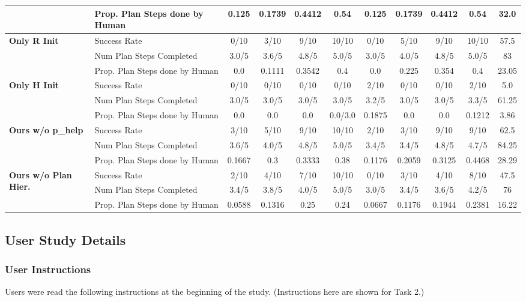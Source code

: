 \begin{table}[h]
{\begin{tabular}{|l|l|c|c|c|c|c|c|c|c|c|}
& Prop. Plan Steps done by Human & 0.125 & 0.1739 & 0.4412 & 0.54 & 0.125 & 0.1739 & 0.4412 & 0.54 & 32.0 \\
\hline
\multirow{3}{*}{\textbf{Only R Init}} 
& Success Rate & 0/10 & 3/10 & 9/10 & 10/10 & 0/10 & 5/10 & 9/10 & 10/10 & 57.5 \\
& Num Plan Steps Completed & 3.0/5 & 3.6/5 & 4.8/5 & 5.0/5 & 3.0/5 & 4.0/5 & 4.8/5 & 5.0/5 & 83 \\
& Prop. Plan Steps done by Human & 0.0 & 0.1111 & 0.3542 & 0.4 & 0.0 & 0.225 & 0.354 & 0.4 & 23.05 \\
\hline
\multirow{3}{*}{\textbf{Only H Init}} 
& Success Rate & 0/10 & 0/10 & 0/10 & 0/10 & 2/10 & 0/10 & 0/10 & 2/10 & 5.0 \\
& Num Plan Steps Completed & 3.0/5 & 3.0/5 & 3.0/5 & 3.0/5 & 3.2/5 & 3.0/5 & 3.0/5 & 3.3/5 & 61.25 \\
& Prop. Plan Steps done by Human & 0.0 & 0.0 & 0.0 & 0.0/3.0 & 0.1875 & 0.0 & 0.0 & 0.1212 & 3.86 \\
\hline
\multirow{3}{*}{\textbf{Ours w/o p\_help}} 
& Success Rate & 3/10 & 5/10 & 9/10 & 10/10 & 2/10 & 3/10 & 9/10 & 9/10 & 62.5 \\
& Num Plan Steps Completed & 3.6/5 & 4.0/5 & 4.8/5 & 5.0/5 & 3.4/5 & 3.4/5 & 4.8/5 & 4.7/5 & 84.25 \\
& Prop. Plan Steps done by Human & 0.1667 & 0.3 & 0.3333 & 0.38 & 0.1176 & 0.2059 & 0.3125 & 0.4468 & 28.29 \\
\hline
\multirow{3}{*}{\textbf{Ours w/o Plan Hier.}} 
& Success Rate & 2/10 & 4/10 & 7/10 & 10/10 & 0/10 & 3/10 & 4/10 & 8/10 & 47.5 \\
& Num Plan Steps Completed & 3.4/5 & 3.8/5 & 4.0/5 & 5.0/5 & 3.0/5 & 3.4/5 & 3.6/5 & 4.2/5 & 76 \\
& Prop. Plan Steps done by Human & 0.0588 & 0.1316 & 0.25 & 0.24 & 0.0667 & 0.1176 & 0.1944 & 0.2381 & 16.22 \\
\hline
\end{tabular}
}
\end{table}

\subsection{User Study Details}
\label{app:user-study-details}
\subsubsection{User Instructions}
Users were read the following instructions at the beginning of the study. (Instructions here are shown for Task 2.)

